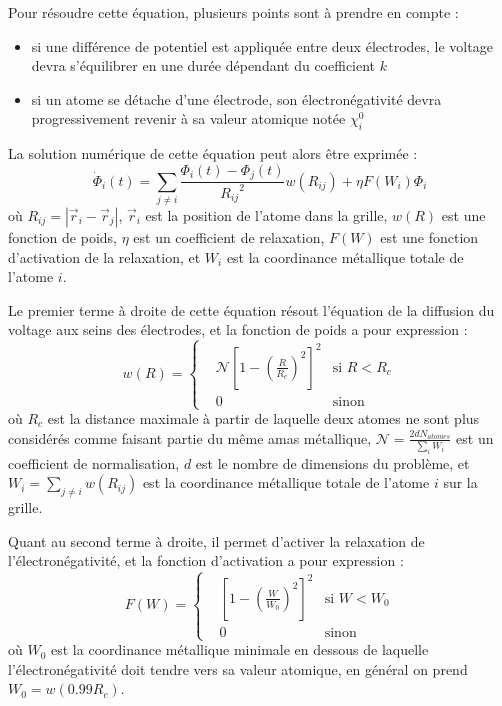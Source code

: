 Pour résoudre cette équation, plusieurs points sont à prendre en compte :
\begin{itemize}
    \item si une différence de potentiel est appliquée entre deux électrodes, le voltage devra s'équilibrer en une durée dépendant du coefficient $k$
    \item si un atome se détache d'une électrode, son électronégativité devra progressivement revenir à sa valeur atomique notée $\chi_i^0$
\end{itemize}

La solution numérique de cette équation peut alors être exprimée :
\begin{equation}
    \boxed%
    {
        \dot{\Phi}_i (t) = \sum_{j \neq i} \frac{\Phi_i (t) - \Phi_j (t)}{{R_{ij}}^2}w(R_{ij}) + \eta F(W_i) \Phi_i
    }
    \label{eq:echemdid_solution_numerique}
\end{equation}
où $R_{ij} = | \vec{r}_i - \vec{r}_j |$, $\vec{r}_i$ est la position de l'atome dans la grille, $w(R)$ est une fonction de poids, $\eta$ est un coefficient de relaxation, $F(W)$ est une fonction d'activation de la relaxation, et $W_i$ est la coordinance métallique totale de l'atome $i$.

Le premier terme à droite de cette équation résout l'équation de la diffusion du voltage aux seins des électrodes, et la fonction de poids a pour expression :
\begin{equation*}
    w(R) = \left\{
        \begin{aligned}
            &\mathcal{N} \left[ 1 - \left(\frac{R}{R_c}\right)^2 \right]^2 &\text{si } R < R_c\\
            &0 &\text{sinon}
        \end{aligned}
    \right.
\end{equation*}
où $R_c$ est la distance maximale à partir de laquelle deux atomes ne sont plus considérés comme faisant partie du même amas métallique, $\mathcal{N} = \frac{2 d N_{atomes}}{\sum_{i} W_i}$ est un coefficient de normalisation, $d$ est le nombre de dimensions du problème, et $W_i = \sum_{j \neq i} w(R_{ij})$ est la coordinance métallique totale de l'atome $i$ sur la grille.

Quant au second terme à droite, il permet d'activer la relaxation de l'électronégativité, et la fonction d'activation a pour expression :
\begin{equation*}
    F(W) = \left\{
        \begin{aligned}
            &\left[ 1 - \left( \frac{W}{W_0}\right)^2\right]^2 &\text{si } W < W_0\\
            &0 &\text{sinon}
        \end{aligned}
    \right.
\end{equation*}
où $W_0$ est la coordinance métallique minimale en dessous de laquelle l'électronégativité doit tendre vers sa valeur atomique, en général on prend $W_0 = w(\num{0.99}R_c)$.

